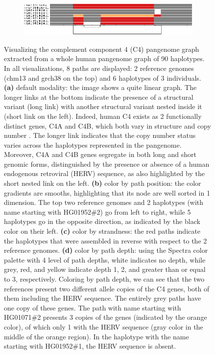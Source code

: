 \begin{figure}[h!]
    \begin{subfigure}[b]{.50\linewidth}
        \caption{}
        \centering
        \includegraphics[width=\linewidth, trim=0 +1.5cm -0.5cm 0.5cm]{fig/visualization_1D/chr6_pan_fa_a2fb268_4030258_d9f1245_smooth_gfa_C4_sorted_m}
        \label{fig:odgi_viz_color_by_path_depth}
    \end{subfigure}

    \caption{
        Visualizing the complement component 4 (C4) pangenome graph extracted from a whole human pangenome graph of 90 haplotypes.
        In all visualizations, 8 paths are displayed: 2 reference genomes (chm13 and grch38 on the top) and 6 haplotypes of 3 individuals.
        \textbf{(a)} default modality: the image shows a quite linear graph.
        The longer links at the bottom indicate the presence of a structural variant (long link) with another structural variant nested inside it (short link on the left).
        Indeed, human C4 exists as 2 functionally distinct genes, C4A and C4B, which both vary in structure and copy number \citep{Sekar_2016}. The longer link indicates that the copy number status varies across the haplotypes represented in the pangenome.
        Moreover, C4A and C4B genes segregate in both long and short genomic forms, distinguished by the presence or absence of a human endogenous retroviral (HERV) sequence, as also highlighted by the short nested link on the left.
        \textbf{(b)} color by path position: the color gradients are smooths, highlighting that its node are well sorted in 1 dimension.
        The top two reference genomes and 2 haplotypes (with name starting with HG01952\#2) go from left to right, while 5 haplotypes go in the opposite direction, as indicated by the black color on their left.
        \textbf{(c)} color by strandness: the red paths indicate the haplotypes that were assembled in reverse with respect to the 2 reference genomes.
        \textbf{(d)} color by path depth: using the Spectra color palette with 4 level of path depths, white indicates no depth, while grey, red, and yellow indicate depth 1, 2, and greater than or equal to 3, respectively.
        Coloring by path depth, we can see that the two references present two different allele copies of the C4 genes, both of them including the HERV sequence.
        The entirely grey paths have one copy of these genes.
        The path with name starting with HG01071\#2 presents 3 copies of the genes (indicated by the orange color), of which only 1 with the HERV sequence (gray color in the middle of the orange region).
        In the haplotype with the name starting with HG01952\#1, the HERV sequence is absent.
    }
    \label{fig:odgi_viz}
\end{figure}
